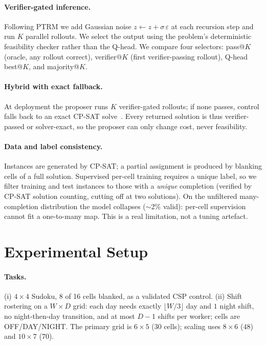 \documentclass{article}
\begin{document}
\paragraph{Verifier-gated inference.} Following PTRM we add Gaussian noise
$z \leftarrow z + \sigma\,\varepsilon$ at each recursion step and run $K$ parallel
rollouts. We select the output using the problem's deterministic feasibility
checker rather than the Q-head. We compare four selectors: pass@$K$ (oracle, any
rollout correct), verifier@$K$ (first verifier-passing rollout), Q-head best@$K$,
and majority@$K$.

\paragraph{Hybrid with exact fallback.} At deployment the proposer runs $K$
verifier-gated rollouts; if none passes, control falls back to an exact CP-SAT
solve~\cite{ortools}. Every returned solution is thus verifier-passed or
solver-exact, so the proposer can only change cost, never feasibility.

\paragraph{Data and label consistency.} Instances are generated by CP-SAT; a
partial assignment is produced by blanking cells of a full solution. Supervised
per-cell training requires a unique label, so we filter training and test
instances to those with a \emph{unique} completion (verified by CP-SAT solution
counting, cutting off at two solutions). On the unfiltered many-completion
distribution the model collapses ($\sim$2\% valid): per-cell supervision cannot fit
a one-to-many map. This is a real limitation, not a tuning artefact.

\section{Experimental Setup}

\paragraph{Tasks.} (i) $4\times4$ Sudoku, 8 of 16 cells blanked, as a validated CSP
control. (ii) Shift rostering on a $W\times D$ grid: each day needs exactly
$\lfloor W/3\rfloor$ day and $1$ night shift, no night-then-day transition, and at
most $D{-}1$ shifts per worker; cells are OFF/DAY/NIGHT. The primary grid is
$6\times5$ ($30$ cells); scaling uses $8\times6$ ($48$) and $10\times7$ ($70$).
\end{document}
